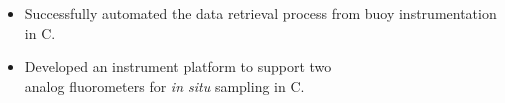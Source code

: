 \documentclass[11pt, twoside, a4paper]{article}
\begin{document}
{\begin{multicols}{2}
                \begin{itemize}[noitemsep,nolistsep]
                	\item Successfully automated the data retrieval process from buoy instrumentation in C. 
                	\item Developed an instrument platform to support two \\analog fluorometers for \textit{in situ} sampling in C. 
                \end{itemize}
                \vspace{5px}
        \end{multicols}
    }
\end{document}
